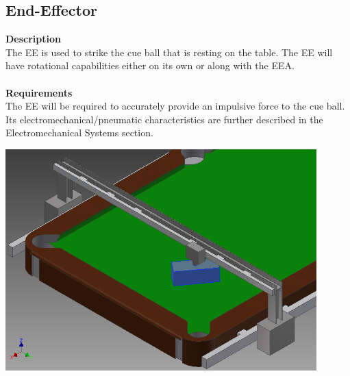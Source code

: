 \documentclass[titlepage]{article}
\begin{document}
\subsection{End-Effector}
\textbf{Description}\\
The EE is used to strike the cue ball that is resting on the table. The EE will have rotational capabilities either on its own or along with the EEA.\\\\
\textbf{Requirements}\\
The EE will be required to accurately provide an impulsive force to the cue ball. Its electromechanical/pneumatic characteristics are further described in the Electromechanical Systems section.
\begin{center}
	\includegraphics[width = 0.9\textwidth]{endEffector.png}
\label{fig:eeFig}
\end{center}

\newpage
\end{document}
